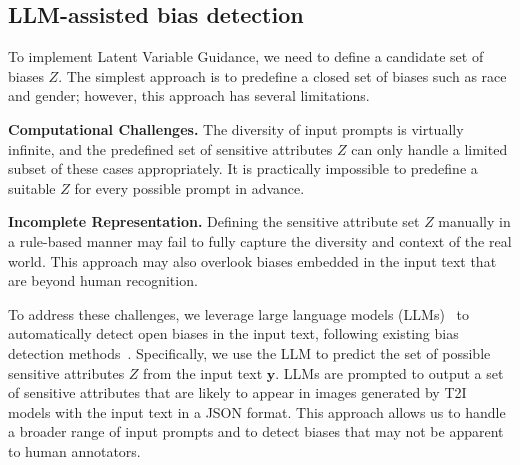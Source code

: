 
\subsection{LLM-assisted bias detection}
\label{sec:llm}
To implement Latent Variable Guidance, we need to define a candidate set of biases $Z$. The simplest approach is to predefine a closed set of biases such as race and gender; however, this approach has several limitations.

\noindent \textbf{Computational Challenges.} The diversity of input prompts is virtually infinite, and the predefined set of sensitive attributes $Z$ can only handle a limited subset of these cases appropriately. It is practically impossible to predefine a suitable $Z$ for every possible prompt in advance.

\noindent \textbf{Incomplete Representation.} Defining the sensitive attribute set $Z$ manually in a rule-based manner may fail to fully capture the diversity and context of the real world. This approach may also overlook biases embedded in the input text that are beyond human recognition.

To address these challenges, we leverage large language models (LLMs)~\cite{gpt4,liu2024deepseek} to automatically detect open biases in the input text, following existing bias detection methods~\cite{D'Incà_2024,Chinchure_2023}. Specifically, we use the LLM to predict the set of possible sensitive attributes $Z$ from the input text $\mathbf{y}$. LLMs are prompted to output a set of sensitive attributes that are likely to appear in images generated by T2I models with the input text in a JSON format. This approach allows us to handle a broader range of input prompts and to detect biases that may not be apparent to human annotators.


